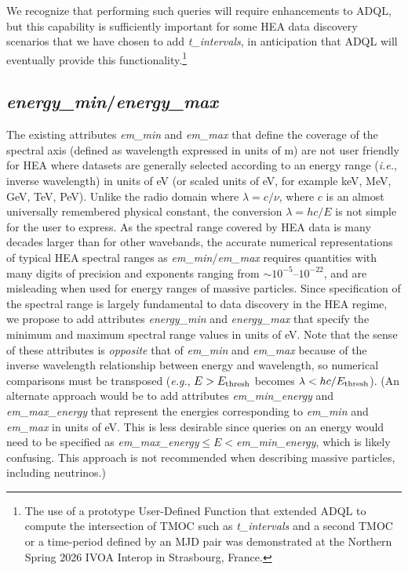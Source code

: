 \documentclass[11pt,a4paper]{ivoa}
\begin{document}
We recognize that performing such queries will require enhancements to ADQL, but this capability is sufficiently important for some \gls{HEA} data discovery scenarios that we have chosen to add {\em t\_intervals\/}, in anticipation that ADQL will eventually provide this functionality.\footnote{The use of a prototype User-Defined Function that extended ADQL to compute the intersection of TMOC such as {\em t\_intervals} and a second TMOC or a time-period defined by an MJD pair was demonstrated at the Northern Spring 2026 IVOA Interop in Strasbourg, France.}

\subsection{{\em energy\_min\/}/{\em energy\_max\/}}

The existing attributes {\em em\_min\/} and {\em em\_max\/} that define the coverage of the spectral axis (defined as wavelength expressed in units of m) are not user friendly for \gls{HEA} where datasets are generally selected according to an energy range ({\em i.e.\/}, inverse wavelength) in units of eV (or scaled units of eV, for example keV, MeV, GeV, TeV, PeV). Unlike the radio domain where $\lambda = c/\nu$, where $c$ is an almost universally remembered physical constant, the conversion $\lambda = hc/E$ is not simple for the user to express. As the spectral range covered by \gls{HEA} data is many decades larger than for other wavebands, the accurate numerical representations of typical \gls{HEA} spectral ranges as {\em em\_min\/}/{\em em\_max\/} requires quantities with many digits of precision and exponents ranging from $\sim\!10^{-5}$--$10^{-22}$, and are misleading when used for energy ranges of massive particles.  Since specification of the spectral range is largely fundamental to data discovery in the \gls{HEA} regime, we propose to add attributes {\em energy\_min\/} and {\em energy\_max\/} that specify the minimum and maximum spectral range values in units of eV\null. Note that the sense of these attributes is {\em opposite\/} that of {\em em\_min\/} and {\em em\_max\/} because of the inverse wavelength relationship between energy and wavelength, so numerical comparisons must be transposed ({\em e.g.\/}, $E>E_{\rm thresh}$ becomes $\lambda<hc/E_{\rm thresh}$).  (An alternate approach would be to add attributes {\em em\_min\_energy\/} and {\em em\_max\_energy\/} that represent the energies corresponding to {\em em\_min\/} and {\em em\_max\/} in units of eV\null. This is less desirable since queries on an energy would need to be specified as {\em em\_max\_energy\/}${}\leq E <{}${\em em\_min\_energy\/}, which is likely confusing. This approach is not recommended when describing massive particles, including neutrinos.)
\end{document}
